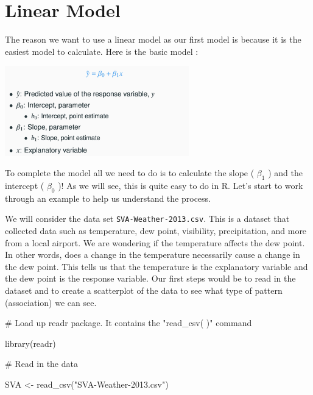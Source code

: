 \documentclass[
  letterpaper,
  DIV=11,
  numbers=noendperiod]{scrreprt}
\newenvironment{Shaded}{\begin{snugshade}}{\end{snugshade}}
\newcommand{\CommentTok}[1]{\textcolor[rgb]{0.37,0.37,0.37}{#1}}
\newcommand{\FunctionTok}[1]{\textcolor[rgb]{0.28,0.35,0.67}{#1}}
\newcommand{\NormalTok}[1]{\textcolor[rgb]{0.00,0.23,0.31}{#1}}
\newcommand{\OtherTok}[1]{\textcolor[rgb]{0.00,0.23,0.31}{#1}}
\newcommand{\StringTok}[1]{\textcolor[rgb]{0.13,0.47,0.30}{#1}}
\begin{document}
\section*{Linear Model}\label{linear-model}


The reason we want to use a linear model as our first model is because
it is the easiest model to calculate. Here is the basic model :

\includegraphics[width=0.6\textwidth,height=\textheight]{./images/LMR_3.jpg}

To complete the model all we need to do is to calculate the slope (
\(\beta_1\) ) and the intercept ( \(\beta_0\) )! As we will see, this is
quite easy to do in R. Let's start to work through an example to help us
understand the process.

We will consider the data set \texttt{SVA-Weather-2013.csv}. This is a
dataset that collected data such as temperature, dew point, visibility,
precipitation, and more from a local airport. We are wondering if the
temperature affects the dew point. In other words, does a change in the
temperature necessarily cause a change in the dew point. This tells us
that the temperature is the explanatory variable and the dew point is
the response variable. Our first steps would be to read in the dataset
and to create a scatterplot of the data to see what type of pattern
(association) we can see.

\begin{Shaded}
\begin{Highlighting}[]
\CommentTok{\# Load up readr package. It contains the "read\_csv( )" command}

\FunctionTok{library}\NormalTok{(readr)}
\end{Highlighting}
\end{Shaded}

\begin{Shaded}
\begin{Highlighting}[]
\CommentTok{\# Read in the data}

\NormalTok{SVA }\OtherTok{\textless{}{-}} \FunctionTok{read\_csv}\NormalTok{(}\StringTok{"SVA{-}Weather{-}2013.csv"}\NormalTok{)}
\end{Highlighting}
\end{Shaded}
\end{document}
